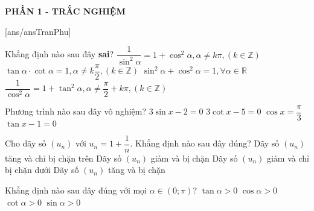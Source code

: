
\begin{center}
	\textbf{PHẦN 1 - TRẮC NGHIỆM}
\end{center}
[ans/ansTranPhu]
\setcounter{ex}{10}\setcounter{bt}{0}
\begin{ex}%
	Khẳng định nào sau đây \textbf{sai}?
	\choice
	{\True$\dfrac{1}{\sin^2 \alpha} = 1+ \cos^2 \alpha, \alpha \ne k \pi,(k \in \mathbb{Z})$}
	{$\tan \alpha \cdot \cot \alpha =1, \alpha \ne k\dfrac{\pi}{2}, (k \in \mathbb{Z})$}
	{$\sin^2 \alpha + \cos^2 \alpha =1, \forall \alpha \in \mathbb{R}$}
	{$\dfrac{1}{\cos^2 \alpha}=1+\tan^2 \alpha, \alpha \ne \dfrac{\pi}{2}+k \pi, (k \in \mathbb{Z})$}
\end{ex}

\begin{ex}%
	Phương trình nào sau đây vô nghiệm?
	\choice
	{$3\sin{x}-2=0$}
	{$3\cot{x}-5=0$}
	{\True $\cos{x}=\dfrac{\pi}{3}$}
	{$\tan{x}-1=0$}
\end{ex}

\begin{ex}%
	Cho dãy số $(u_n)$ với $u_n=1+\dfrac{1}{n}$. Khẳng định nào sau đây đúng?
	\choice
	{Dãy số $(u_n)$ tăng và chỉ bị chặn trên}
	{\True Dãy số $(u_n)$ giảm và bị chặn}
	{Dãy số $(u_n)$ giảm và chỉ bị chặn dưới}
	{Dãy số $(u_n)$ tăng và bị chặn}
\end{ex}

\begin{ex}%
	Khẳng định nào sau đây đúng với mọi $\alpha \in (0;\pi)$?
	\choice
	{$\tan \alpha>0$}
	{$\cos \alpha>0$}
	{$\cot \alpha>0$}
	{\True $\sin \alpha>0$}
\end{ex}


